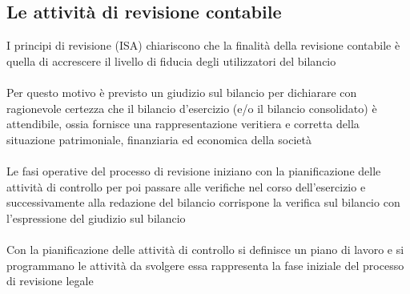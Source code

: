 \documentclass{report}
\begin{document}
\subsection{Le attività di revisione contabile} %
\label{sub:Le attività di revisione contabile}
I principi di revisione (ISA) chiariscono che la finalità della revisione contabile è quella di accrescere il livello di fiducia degli utilizzatori del bilancio
\\
\\
Per questo motivo è previsto un giudizio sul bilancio per dichiarare con ragionevole certezza che il bilancio d'esercizio (e/o il bilancio consolidato) è attendibile, ossia fornisce una rappresentazione veritiera e corretta della situazione patrimoniale, finanziaria ed economica della società
\\
\\
Le fasi operative del processo di revisione iniziano con la pianificazione delle attività di controllo per poi passare alle verifiche nel corso dell'esercizio e successivamente alla redazione del bilancio corrispone la verifica sul bilancio con l'espressione del giudizio sul bilancio
\\
\\
Con la pianificazione delle attività di controllo si definisce un piano di lavoro e si programmano le attività da svolgere essa rappresenta la fase iniziale del processo di revisione legale

\end{document}
